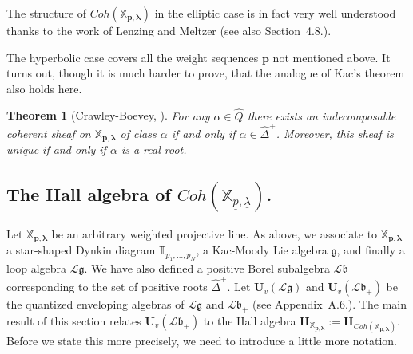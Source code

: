 \documentclass[a4paper,10pt]{amsart}
\def\H{\mathbf{H}}
\def\U{\mathbf{U}}
\def\a{\alpha}
\def\p{\mathbf{p}}
\def\g{\mathfrak{g}}
\def\bo{\mathfrak{b}}
\def\xpl{\mathbb{X}_{\mathbf{p},\boldsymbol{\lambda}}}
\newtheorem{theo}{\bf{Theorem}}[section]
\numberwithin{equation}{section}
\begin{document}
{\vspace{.15in}

The structure of $Coh(\xpl)$ in the elliptic case is in fact very well understood thanks to the work of Lenzing and Meltzer \cite{LM} (see also Section~4.8.).

\vspace{.15in}

The hyperbolic case covers all the weight sequences $\p$ not mentioned above. It turns out, though it is much harder to prove, that the analogue of Kac's theorem also holds here.

\vspace{.1in}

\begin{theo}[Crawley-Boevey, \cite{CB2}]\label{T:CBKac} For any $\a \in \widehat{Q}$ there exists an indecomposable coherent sheaf on $\xpl$ of class $\a$ if and only if $\a\in \widehat{\Delta}^+$. Moreover, this sheaf is unique if and only if $\a$ is a real root.\end{theo}

\vspace{.2in}

\subsection{The Hall algebra of $Coh(\mathbb{X}_{\underline{p},\underline{\lambda}})$.}

\vspace{.15in}

Let $\xpl$ be an arbitrary weighted projective line. As above, we associate to $\xpl$ a star-shaped Dynkin diagram $\mathbb{T}_{p_1, \ldots, p_N}$, a Kac-Moody Lie algebra $\g$, and finally a loop algebra $\mathcal{L}\g$. We have also defined a positive Borel subalgebra $\mathcal{L}\bo_+$ corresponding to the set of positive roots $\widehat{\Delta}^+$.
Let $\U_v(\mathcal{L}\g)$ and $\U_v(\mathcal{L}\bo_+)$ be the quantized enveloping algebras of $\mathcal{L}\g$ and $\mathcal{L}\bo_+$ (see Appendix~A.6.). The main result of this section relates $\U_v(\mathcal{L}\bo_+)$ to the Hall algebra $\H_{\xpl}:=\H_{Coh(\xpl)}$. Before we state this more precisely, we need to introduce a little more notation.

\vspace{.15in}

}
\end{document}
